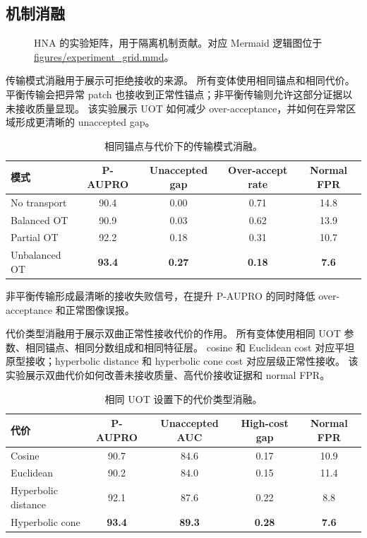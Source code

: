 \documentclass[10pt,fontset=none]{ctexart}
\newcommand{\method}{HNA}
\begin{document}
\subsection{机制消融}

\begin{figure}[t]
\centering
{}
\caption{\method{} 的实验矩阵，用于隔离机制贡献。对应 Mermaid 逻辑图位于 \url{figures/experiment_grid.mmd}。}
\label{fig:experiment-grid}
\end{figure}

传输模式消融用于展示可拒绝接收的来源。
所有变体使用相同锚点和相同代价。
平衡传输会把异常 patch 也接收到正常性锚点；非平衡传输则允许这部分证据以未接收质量显现。
该实验展示 UOT 如何减少 over-acceptance，并如何在异常区域形成更清晰的 unaccepted gap。

\begin{table}[t]
\centering
\caption{相同锚点与代价下的传输模式消融。}
\label{tab:transport}
\begin{tabular}{lcccc}
\toprule
模式 & P-AUPRO & Unaccepted gap & Over-accept rate & Normal FPR \\
\midrule
No transport & 90.4 & 0.00 & 0.71 & 14.8 \\
Balanced OT & 90.9 & 0.03 & 0.62 & 13.9 \\
Partial OT & 92.2 & 0.18 & 0.31 & 10.7 \\
Unbalanced OT & \textbf{93.4} & \textbf{0.27} & \textbf{0.18} & \textbf{7.6} \\
\bottomrule
\end{tabular}
\end{table}

非平衡传输形成最清晰的接收失败信号，在提升 P-AUPRO 的同时降低 over-acceptance 和正常图像误报。

代价类型消融用于展示双曲正常性接收代价的作用。
所有变体使用相同 UOT 参数、相同锚点、相同分数组成和相同特征层。
cosine 和 Euclidean cost 对应平坦原型接收；hyperbolic distance 和 hyperbolic cone cost 对应层级正常性接收。
该实验展示双曲代价如何改善未接收质量、高代价接收证据和 normal FPR。

\begin{table}[t]
\centering
\caption{相同 UOT 设置下的代价类型消融。}
\label{tab:cost}
\begin{tabular}{lcccc}
\toprule
代价 & P-AUPRO & Unaccepted AUC & High-cost gap & Normal FPR \\
\midrule
Cosine & 90.7 & 84.6 & 0.17 & 10.9 \\
Euclidean & 90.2 & 84.0 & 0.15 & 11.4 \\
Hyperbolic distance & 92.1 & 87.6 & 0.22 & 8.8 \\
Hyperbolic cone & \textbf{93.4} & \textbf{89.3} & \textbf{0.28} & \textbf{7.6} \\
\bottomrule
\end{tabular}
\end{table}
\end{document}
